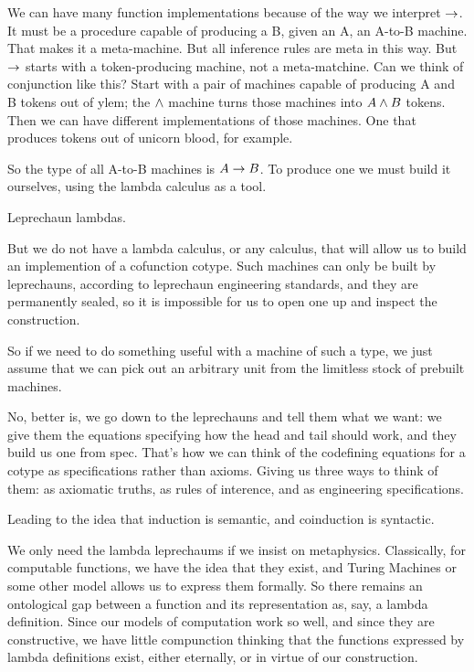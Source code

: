 \documentclass{article}
\begin{document}
We can have many function implementations because of the way we
interpret \(\rightarrow\). It must be a procedure capable of producing a B,
given an A, an A-to-B machine. That makes it a meta-machine. But all
inference rules are meta in this way. But \(\rightarrow\) starts with a
token-producing machine, not a meta-matchine. Can we think of
conjunction like this? Start with a pair of machines capable of
producing A and B tokens out of ylem; the \(\land\) machine turns
those machines into \(A\land B\) tokens. Then we can have different
implementations of those machines. One that produces tokens out of
unicorn blood, for example.

So the type of all A-to-B machines is \(A\rightarrow B\). To produce one we
must build it ourselves, using the lambda calculus as a tool.

Leprechaun lambdas.

But we do not have a lambda calculus, or any calculus, that will allow
us to build an implemention of a cofunction cotype. Such machines can
only be built by leprechauns, according to leprechaun engineering
standards, and they are permanently sealed, so it is impossible for us
to open one up and inspect the construction.

So if we need to do something useful with a machine of such a type, we
just assume that we can pick out an arbitrary unit from the limitless
stock of prebuilt machines.

No, better is, we go down to the leprechauns and tell them what we
want: we give them the equations specifying how the head and tail
should work, and they build us one from spec. That's how we can think
of the codefining equations for a cotype as specifications rather than
axioms. Giving us three ways to think of them: as axiomatic truths, as
rules of interence, and as engineering specifications.

Leading to the idea that induction is semantic, and coinduction is
syntactic.

We only need the lambda leprechaums if we insist on metaphysics.
Classically, for computable functions, we have the idea that they
exist, and Turing Machines or some other model allows us to express
them formally. So there remains an ontological gap between a function
and its representation as, say, a lambda definition. Since our models
of computation work so well, and since they are constructive, we have
little compunction thinking that the functions expressed by lambda
definitions exist, either eternally, or in virtue of our construction.
\end{document}
